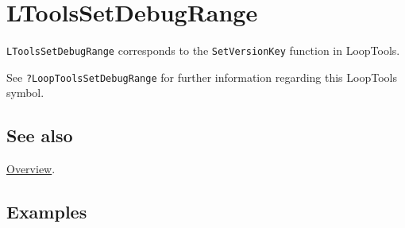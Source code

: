 \documentclass[../FeynHelpersManual.tex]{subfiles}
\begin{document}
\hypertarget{ltoolssetdebugrange}{
\section{LToolsSetDebugRange}\label{ltoolssetdebugrange}}

\texttt{LToolsSetDebugRange} corresponds to the \texttt{SetVersionKey}
function in LoopTools.

See \texttt{?LoopTools\textasciigrave SetDebugRange} for further
information regarding this LoopTools symbol.

\subsection{See also}

\hyperlink{toc}{Overview}.

\subsection{Examples}
\end{document}
